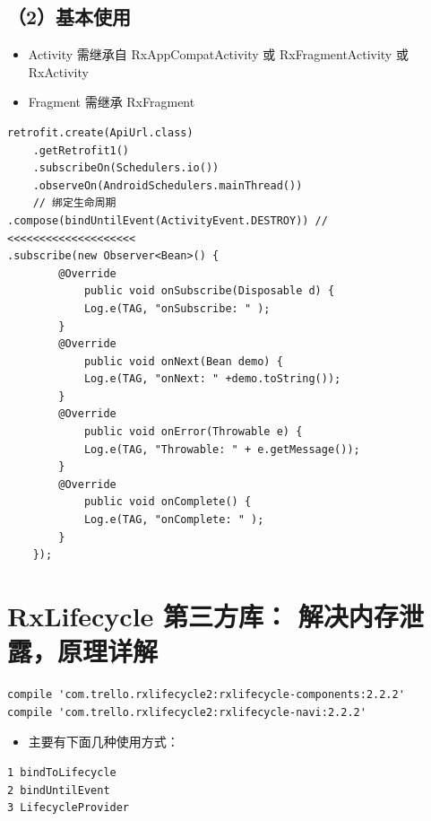 \documentclass[9pt, b5paper]{article}
\begin{document}
\subsection{（2）基本使用}
\label{sec-19-4}
\begin{itemize}
\item Activity 需继承自 RxAppCompatActivity 或 RxFragmentActivity 或 RxActivity
\item Fragment 需继承  RxFragment
\end{itemize}
\begin{verbatim}
retrofit.create(ApiUrl.class)
    .getRetrofit1()
    .subscribeOn(Schedulers.io())
    .observeOn(AndroidSchedulers.mainThread())
    // 绑定生命周期
.compose(bindUntilEvent(ActivityEvent.DESTROY)) // <<<<<<<<<<<<<<<<<<<< 
.subscribe(new Observer<Bean>() {
        @Override
            public void onSubscribe(Disposable d) {
            Log.e(TAG, "onSubscribe: " );
        }
        @Override
            public void onNext(Bean demo) {
            Log.e(TAG, "onNext: " +demo.toString());
        }
        @Override
            public void onError(Throwable e) {
            Log.e(TAG, "Throwable: " + e.getMessage());
        }
        @Override
            public void onComplete() {
            Log.e(TAG, "onComplete: " );
        }
    });
\end{verbatim}

\section{RxLifecycle 第三方库： 解决内存泄露，原理详解}
\label{sec-20}
\begin{verbatim}
compile 'com.trello.rxlifecycle2:rxlifecycle-components:2.2.2'
compile 'com.trello.rxlifecycle2:rxlifecycle-navi:2.2.2'
\end{verbatim}
\begin{itemize}
\item 主要有下面几种使用方式：
\end{itemize}
\begin{verbatim}
1 bindToLifecycle
2 bindUntilEvent
3 LifecycleProvider
\end{verbatim}
\end{document}
